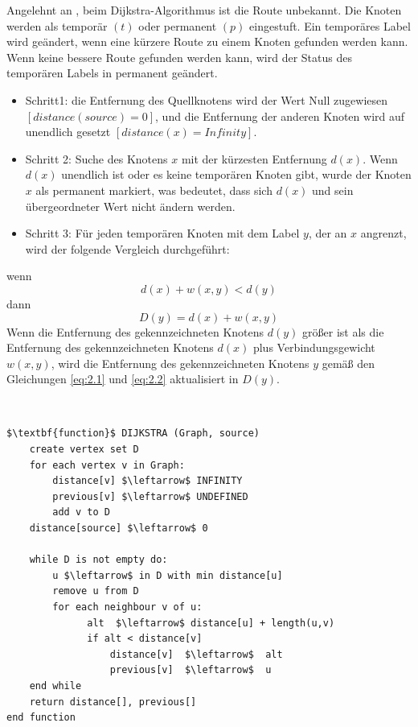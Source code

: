 Angelehnt an \cite{Abusalim2020}, beim Dijkstra-Algorithmus ist die Route unbekannt. Die Knoten werden als temporär $(t)$ oder permanent $(p)$ eingestuft.
Ein temporäres Label wird geändert, wenn eine kürzere Route zu einem Knoten gefunden werden kann. Wenn keine bessere Route gefunden werden kann, wird der Status des temporären Labels in permanent geändert.
\begin{itemize}
	\item Schritt1: die Entfernung des Quellknotens wird der Wert Null zugewiesen $[distance (source) = 0]$, und die Entfernung der anderen
		Knoten wird auf unendlich gesetzt $[distance(x) = Infinity]$.
	\item Schritt 2: Suche des Knotens $x$ mit der kürzesten Entfernung $d(x)$. Wenn $d(x)$ unendlich ist oder es keine temporären Knoten gibt,
		wurde der Knoten $x$ als permanent markiert, was bedeutet, dass sich $d(x)$ und sein übergeordneter Wert nicht ändern werden.
	\item Schritt 3: Für jeden temporären Knoten mit dem Label $y$, der an $x$ angrenzt, wird der folgende Vergleich durchgeführt:

	
\end{itemize}
wenn
\begin{equation} \label{eq:2.1}
	d(x) + w (x, y) < d(y)	
\end{equation}
dann
\begin{equation} \label{eq:2.2}
	D(y) = d(x) + w (x, y)
\end{equation}
\newline
Wenn die Entfernung des gekennzeichneten Knotens $d(y)$ größer ist als die Entfernung des gekennzeichneten Knotens $d(x)$ plus Verbindungsgewicht $w(x, y)$, 
wird die Entfernung des gekennzeichneten Knotens $y$ gemäß den Gleichungen \ref{eq:2.1} und \ref{eq:2.2} aktualisiert in $D(y)$.

\noindent \\
\begin{minipage}{1.0\textwidth} \small
\begin{lstlisting}
$\textbf{function}$ DIJKSTRA (Graph, source)
	create vertex set D
	for each vertex v in Graph:
		distance[v] $\leftarrow$ INFINITY
		previous[v] $\leftarrow$ UNDEFINED
		add v to D
	distance[source] $\leftarrow$ 0
	
	while D is not empty do:
	    u $\leftarrow$ in D with min distance[u]
	    remove u from D
	    for each neighbour v of u:
	          alt  $\leftarrow$ distance[u] + length(u,v)
	          if alt < distance[v]
	              distance[v]  $\leftarrow$  alt
	              previous[v]  $\leftarrow$  u
	end while
	return distance[], previous[]
end function

\end{lstlisting}
 \label{Dijkstra Algorithmus Pseudocode}
\end{minipage}

